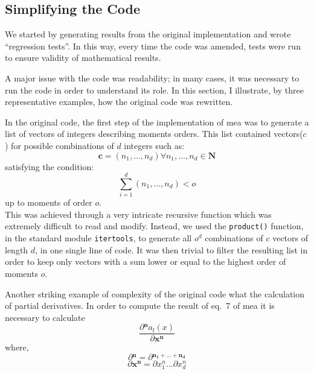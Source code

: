 \subsection{Simplifying the Code}
We started by generating results from the original implementation and wrote ``regression tests''.
In this way, every time the code was amended, tests were run to ensure validity of mathematical results.

A major issue with the code was readability; in many cases, it was necessary to run the code in order to understand its role.
In this section, I illustrate, by three representative examples, how the original code was rewritten.

In the original code, the first step of the implementation of \acrshort{mea} was to generate a list of vectors of integers describing moments orders.
This list contained vectors($c$) for possible combinations of $d$ integers such as:\\
\[\mathbf{c} =(n_1, \dots, n_d) \forall{n_1, \dots, n_d \in \mathbf{N}}\]
satisfying the condition:\\
\[\sum_{i=1}^{d} (n_1, \dots, n_d) < o\]
up to moments of order $o$.\\

This was achieved through a very intricate recursive function which was extremely difficult to read and modify.
Instead, we used the \texttt{product()} function, in the standard module \texttt{itertools},
to generate all $o^d$ combinations of $c$ vectors of length  $d$, in one single line of code.
It was then trivial to filter the resulting list in order to keep only vectors with a sum lower or equal to the highest order of moments $o$.

Another striking example of complexity of the original code what the calculation of partial derivatives.
In order to compute the result of eq.~7 of \gls{mea}\cite{ale_general_2013} it is necessary to calculate\\
\[\frac{\partial{}^\mathbf{n} a_l(x)}{\partial{}\mathbf{x^n}}\]
where,\\
\[\partial{}^\mathbf{n} = \partial{}^\mathbf{n_1+\dots{}+n_d}\]
\[\partial{} \mathbf{x^n} = \partial{} x^n_1 \dots{} \partial x^n_d\]

